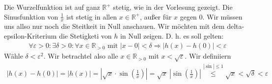\begin{itemize}
		Die Wurzelfunktion ist auf ganz $ \mathbb{ R }^+ $ stetig, wie in der Vorlesung gezeigt.
		Die Sinusfunktion von $ \frac{ 1 }{ x } $ ist stetig in allen $ x \in \mathbb{ R }^+ $, außer für $ x $ gegen 0.
		Wir müssen uns allso nur noch die Steitkeit in Null anschauen.
		Wir möchten mit dem delta-epsilon-Kriterium die Stetigketi von $ h $ in Null zeigen.
		D. h. es soll gelten:
		\begin{align*}
			\forall \varepsilon > 0 : \exists \delta > 0 : \forall x \in \mathbb{ R }_{> 0} \text{ mit }
			\vert x - 0 \vert < \delta \Rightarrow \vert h( x ) -  h( 0 ) \vert < \varepsilon
		\end{align*}
		Wähle $ \delta  < \varepsilon^2 $.
		Wir betrachtel also alle $ x \in \mathbb{ R }_{> 0} $ mit $ x < \sqrt{ \varepsilon} $.
		Wir definiiern 
		\begin{align*}
			\vert h( x ) -  h( 0 ) \vert = \vert h( x ) \vert = \left\vert \sqrt{ x } \cdot \sin( \frac{ 1 }{ x }) \right\vert
			= \sqrt{ x } \ \left\vert \sin( \frac{ 1 }{ x }) \right\vert \overset{| \sin | \leq 1} \leq \sqrt{ x } < \sqrt{ \delta } < \varepsilon
		\end{align*}

	\end{itemize}
